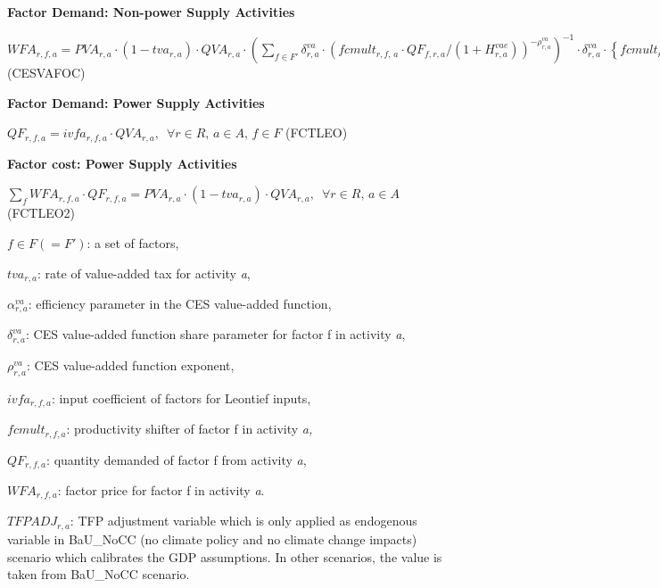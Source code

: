 \documentclass[10pt,a4paper,titlepage,dvipdfmx]{book}
\begin{document}
\begin{flushleft}\textbf{Factor Demand: Non-power Supply Activities}\end{flushleft}


\begin{center}$WFA_{r,f,a}=PVA_{r,a}\cdot \left(1-tva_{r,a}\right)\cdot QVA_{r,a}\cdot \left(\sum _{f\in F'}\delta _{r,a}^{va}\cdot \left(fcmult_{r,f,\,a}\cdot QF_{f,r,a}/\left(1+H _{r,a}^{vae}\right)\right)^{-\rho _{r,a}^{va}}\right)^{-1}\cdot \delta _{r,a}^{va}\cdot \left\{fcmult_{r,f,\,a}/\left(1+H _{r,a}^{vae}\right)\right\}^{-\rho _{r,a}^{va}}\cdot {QF_{r,f,a}}^{-\rho _{r,a}^{va}-1}, \forall r\in R,\,a\in A,\,f\in F$ (CESVAFOC)
\end{center}

\begin{flushleft}\textbf{Factor Demand: Power Supply Activities}\end{flushleft}


\begin{center}$QF_{r,f,a}=ivfa_{r,f,a}\cdot QVA_{r,a},\,\,\,\forall r\in R,\,a\in A,\,f\in F$ (FCTLEO)
\end{center}

\begin{flushleft}\textbf{Factor cost: Power Supply Activities}\end{flushleft}


\begin{center}$\sum _{f}WFA_{r,f,a}\cdot QF_{r,f,a}=PVA_{r,a}\cdot \left(1-tva_{r,a}\right)\cdot QVA_{r,a},\,\,\,\forall r\in R,\,a\in A$ (FCTLEO2)
\end{center}

\begin{flushleft}
$f\in F\left(=F'\right)$: a set of factors,

$tva_{r,a}$: rate of value-added tax for activity \textit{a},

$\alpha _{r,a}^{va}$: efficiency parameter in the CES value-added function,

$\delta _{r,a}^{va}$: CES value-added function share parameter for factor f in activity \textit{a},

$\rho _{r,a}^{va}$: CES value-added function exponent,

$ivfa_{r,f,a}$: input coefficient of factors for Leontief inputs,

$fcmult_{r,f,a}$: productivity shifter of factor f in activity \textit{a,}

$QF_{r,f,a}$: quantity demanded of factor f from activity \textit{a},

$WFA_{r,f,a}$: factor price for factor f in activity \textit{a}.

$TFPADJ_{r,a}$: TFP adjustment variable which is only applied as endogenous variable in BaU\_NoCC (no climate policy and no climate change impacts) scenario which calibrates the GDP assumptions. In other scenarios, the value is taken from BaU\_NoCC scenario.
\end{flushleft}
\end{document}
